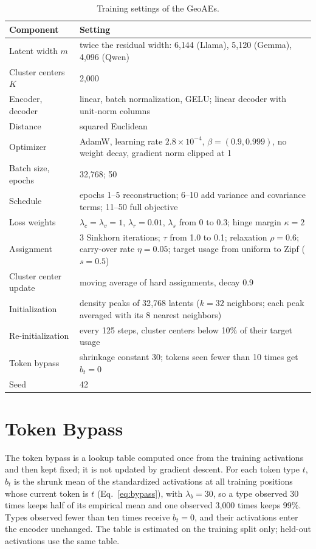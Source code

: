 \documentclass[11pt]{article}
\begin{document}
\begin{table}[ht]
\centering
\small
\begin{tabular}{@{}p{2.6cm}p{4.6cm}@{}}
\toprule
Component & Setting \\
\midrule
Latent width $m$ & twice the residual width: 6{,}144 (Llama), 5{,}120 (Gemma), 4{,}096 (Qwen) \\
Cluster centers $K$ & 2{,}000 \\
Encoder, decoder & linear, batch normalization, GELU; linear decoder with unit-norm columns \\
Distance & squared Euclidean \\
Optimizer & AdamW, learning rate $2.8 \times 10^{-4}$, $\beta = (0.9, 0.999)$, no weight decay, gradient norm clipped at 1 \\
Batch size, epochs & 32{,}768; 50 \\
Schedule & epochs 1--5 reconstruction; 6--10 add variance and covariance terms; 11--50 full objective \\
Loss weights & $\lambda_c = \lambda_v = 1$, $\lambda_r = 0.01$, $\lambda_s$ from 0 to 0.3; hinge margin $\kappa = 2$ \\
Assignment & 3 Sinkhorn iterations; $\tau$ from 1.0 to 0.1; relaxation $\rho = 0.6$; carry-over rate $\eta = 0.05$; target usage from uniform to Zipf ($s = 0.5$) \\
Cluster center update & moving average of hard assignments, decay 0.9 \\
Initialization & density peaks of 32{,}768 latents ($k = 32$ neighbors; each peak averaged with its 8 nearest neighbors) \\
Re-initialization & every 125 steps, cluster centers below 10\% of their target usage \\
Token bypass & shrinkage constant 30; tokens seen fewer than 10 times get $b_t = 0$ \\
Seed & 42 \\
\bottomrule
\end{tabular}
\caption{Training settings of the GeoAEs.}
\label{tab:hyper}
\end{table}

\section{Token Bypass}
\label{app:bypass}

The token bypass is a lookup table computed once from the training activations and then kept fixed; it is not updated by gradient descent. For each token type $t$, $b_t$ is the shrunk mean of the standardized activations at all training positions whose current token is $t$ (Eq.~\ref{eq:bypass}), with $\lambda_b = 30$, so a type observed 30 times keeps half of its empirical mean and one observed 3{,}000 times keeps 99\%. Types observed fewer than ten times receive $b_t = 0$, and their activations enter the encoder unchanged. The table is estimated on the training split only; held-out activations use the same table.
\end{document}
